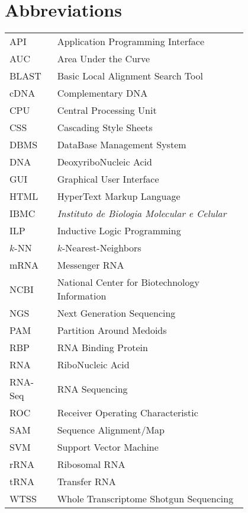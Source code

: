 \chapter*{Abbreviations}

\begin{flushleft}
\begin{tabular}{l p{0.8\linewidth}}
API       & Application Programming Interface\\
AUC       & Area Under the Curve\\
BLAST     & Basic Local Alignment Search Tool\\
cDNA      & Complementary DNA\\
CPU       & Central Processing Unit\\
CSS       & Cascading Style Sheets\\
DBMS      & DataBase Management System\\
DNA       & DeoxyriboNucleic Acid\\
GUI       & Graphical User Interface\\
HTML      & HyperText Markup Language\\
IBMC      & \textit{Instituto de Biologia Molecular e Celular}\\
ILP       & Inductive Logic Programming\\
$k$-NN      & $k$-Nearest-Neighbors\\
mRNA      & Messenger RNA\\
NCBI      & National Center for Biotechnology Information\\
NGS       & Next Generation Sequencing\\
PAM       & Partition Around Medoids\\
RBP       & RNA Binding Protein\\
RNA       & RiboNucleic Acid\\
RNA-Seq   & RNA Sequencing\\
ROC       & Receiver Operating Characteristic\\
SAM       & Sequence Alignment/Map\\
SVM       & Support Vector Machine\\
rRNA      & Ribosomal RNA\\
tRNA      & Transfer RNA\\
WTSS      & Whole Transcriptome Shotgun Sequencing\\
\end{tabular}
\end{flushleft}

